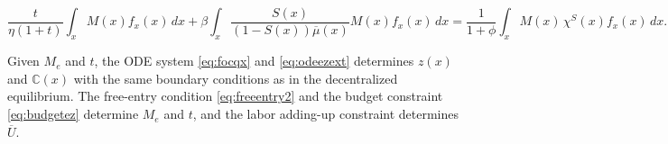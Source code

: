 \begin{equation}\label{eq:budgetez}
	\frac{t}{\eta(1+t)} \int_x M(x) f_x(x)\, dx + \beta\int_x \frac{S(x)}{(1-S(x))\overline{\mu}(x)} M(x) f_x(x)\, dx = \frac{1}{1+\phi} \int_x M(x)\, \chi^S(x) f_x(x)\, dx.
\end{equation}

Given $M_e$ and $t$, the ODE system \eqref{eq:focqx} and \eqref{eq:odeezext} determines $z(x)$ and $\mathbb{C}(x)$ with the same boundary conditions as in the decentralized equilibrium. The free-entry condition \eqref{eq:freeentry2} and the budget constraint \eqref{eq:budgetez} determine $M_e$ and $t$, and the labor adding-up constraint determines $\overline{U}$.


